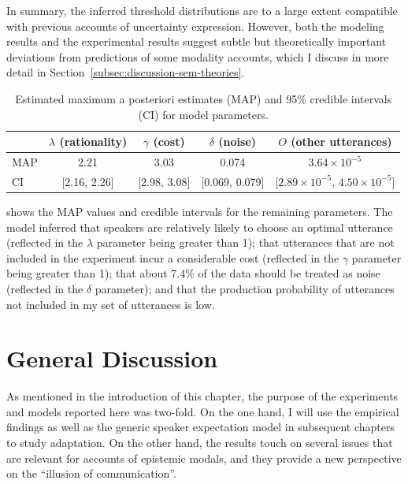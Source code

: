 In summary, the inferred threshold distributions are to a large extent compatible with previous accounts of uncertainty expression. However,
both the modeling results and the experimental results suggest subtle but theoretically important deviations from predictions of some modality accounts, which
I discuss in more detail in Section~\ref{subsec:discussion-sem-theories}.
 
 
 \begin{table}[ht!]
\center
\begin{tabular}{l | c | c | c | c }
     & $\lambda$ (rationality) & $\gamma$ (cost) & $\delta$ (noise) & $O$ (other utterances) \\
      \midrule
      MAP & 2.21 & 3.03 & 0.074 & $3.64 \times 10^{-5}$ \\
      CI & [2.16, 2.26] & [2.98, 3.08] &  [0.069, 0.079] &[$2.89 \times 10^{-5}$, $4.50  \times 10^{-5}$] \\
         \end{tabular}
\caption{Estimated maximum a posteriori estimates (MAP) and 95\% credible intervals (CI) for model parameters. \label{tbl:model-params}}
\end{table}

 shows the MAP values and credible intervals for the remaining parameters. The model inferred that speakers
are relatively likely to choose an optimal utterance (reflected in the $\lambda$ parameter being
greater than 1); that utterances that are not included in the experiment incur a considerable cost  (reflected in the $\gamma$ parameter being greater than 1); that about 7.4\%
of the data should be treated as noise (reflected in the $\delta$ parameter); and that the production probability of utterances not included in my set of utterances is low. 

\section{General Discussion}
\label{sec:chapter-3-gd}

As mentioned in the introduction of this chapter, the purpose of the experiments and models reported here was two-fold. On the one hand, 
I will use the empirical findings as well as the generic speaker expectation model in subsequent chapters to study adaptation. On the other hand,
the results touch on several issues that are relevant for accounts of epistemic modals, and they provide a new perspective on the ``illusion of communication''. 

